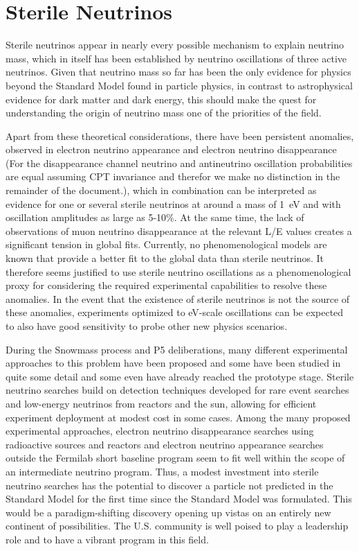 \section{Sterile Neutrinos}
\label{sec:Sterile}

Sterile neutrinos appear in nearly every possible mechanism to explain neutrino mass, which in itself has been established by neutrino oscillations of three active neutrinos. Given that neutrino mass so far has been the only evidence for physics beyond the Standard Model found in particle physics, in contrast to astrophysical evidence for dark matter and dark energy, this should make the quest for understanding the origin of neutrino mass one of the priorities of the field. 

Apart from these theoretical considerations, there have been persistent anomalies, observed in electron neutrino appearance and electron neutrino disappearance (For the disappearance channel neutrino and antineutrino oscillation probabilities are equal assuming CPT invariance and therefor we make no distinction in the remainder of the document.), which in combination can be interpreted as evidence for one or several sterile neutrinos at around a mass of 1~eV and with oscillation amplitudes as large as 5-10\%. At the same time, the lack of observations of muon neutrino disappearance at the relevant L/E values creates a significant tension in global fits. Currently, no phenomenological models are known that provide a better fit to the global data than sterile neutrinos. It therefore seems justified to use sterile neutrino oscillations as a phenomenological proxy for considering the required experimental capabilities to resolve these anomalies. In the event that the existence of sterile neutrinos is not the source of these anomalies, experiments optimized to eV-scale oscillations can be expected to also have good sensitivity to probe other new physics scenarios. 

During the Snowmass process and P5 deliberations, many different experimental approaches to this problem have been proposed and some have been studied in quite some detail and some even have already reached the prototype stage. Sterile neutrino searches build on detection techniques developed for rare event searches and low-energy neutrinos from reactors and the sun, allowing for efficient experiment deployment at modest cost in some cases.  Among the many proposed experimental approaches, electron neutrino disappearance searches using radioactive sources and reactors and electron neutrino appearance searches outside the Fermilab short baseline program seem to fit well within the scope of an intermediate neutrino program. Thus, a modest investment into sterile neutrino searches has the potential to discover a particle not predicted in the Standard Model for the first time since the Standard Model was formulated. This would be a paradigm-shifting discovery opening up vistas on an entirely new continent of possibilities. The U.S. community is well poised to play a leadership role and to have a vibrant program in this field. 

